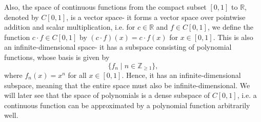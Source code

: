 \documentclass[a4paper, openany]{memoir}
\theoremstyle{definition}
\theoremstyle{plain}
\begin{document}
    Also, the space of continuous functions from the compact subset $[0, 1]$ to $\mathbb{R}$, denoted by $C[0, 1]$, is a vector space- it forms a vector space over pointwise addition and scalar multiplication, i.e. for $c \in \mathbb{R}$ and $f \in C[0, 1]$, we define the function $c \cdot f \in C[0, 1]$ by $(c \cdot f)(x) = c \cdot f(x)$    for $x \in [0, 1]$. This is also an infinite-dimensional space- it has a subspace consisting of polynomial functions, whose basis is given by
    \[\{f_n \mid n \in \mathbb{Z}_{\geq 1}\},\]
    where $f_n(x) = x^n$ for all $x \in [0, 1]$. Hence, it has an infinite-dimensional subspace, meaning that the entire space must also be infinite-dimensional. We will later see that the space of polynomials is a dense subspace of $C[0, 1]$, i.e. a continuous function can be approximated by a polynomial function arbitrarily well.


\end{document}
